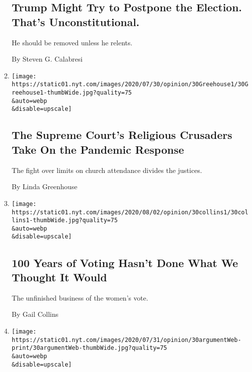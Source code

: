 \begin{enumerate}
{  \subsection{Trump Might Try to Postpone the Election. That's
  Unconstitutional.}\label{trump-might-try-to-postpone-the-election-thats-unconstitutional}}

  He should be removed unless he relents.

  By Steven G. Calabresi
\item
  \href{/2020/07/30/opinion/supreme-court-religion-coronavirus.html}{}

  \texttt{[image: https://static01.nyt.com/images/2020/07/30/opinion/30Greehouse1/30Greehouse1-thumbWide.jpg?quality=75\\\&auto=webp\\\&disable=upscale]}

  \hypertarget{the-supreme-courts-religious-crusaders-take-on-the-pandemic-response}{%
  \subsection{The Supreme Court's Religious Crusaders Take On the
  Pandemic
  Response}\label{the-supreme-courts-religious-crusaders-take-on-the-pandemic-response}}

  The fight over limits on church attendance divides the justices.

  By Linda Greenhouse
\item
  \href{/2020/07/30/opinion/sunday/19th-amendment-women-suffrage.html}{}

  \texttt{[image: https://static01.nyt.com/images/2020/08/02/opinion/30collins1/30collins1-thumbWide.jpg?quality=75\\\&auto=webp\\\&disable=upscale]}

  \hypertarget{100-years-of-voting-hasnt-done-what-we-thought-it-would}{%
  \subsection{100 Years of Voting Hasn't Done What We Thought It
  Would}\label{100-years-of-voting-hasnt-done-what-we-thought-it-would}}

  The unfinished business of the women's vote.

  By Gail Collins
\item
  \href{/2020/07/30/opinion/the-argument-authoritarianism-anne-applebaum.html}{}

  \texttt{[image: https://static01.nyt.com/images/2020/07/31/opinion/30argumentWeb-print/30argumentWeb-thumbWide.jpg?quality=75\\\&auto=webp\\\&disable=upscale]}


\end{enumerate}
